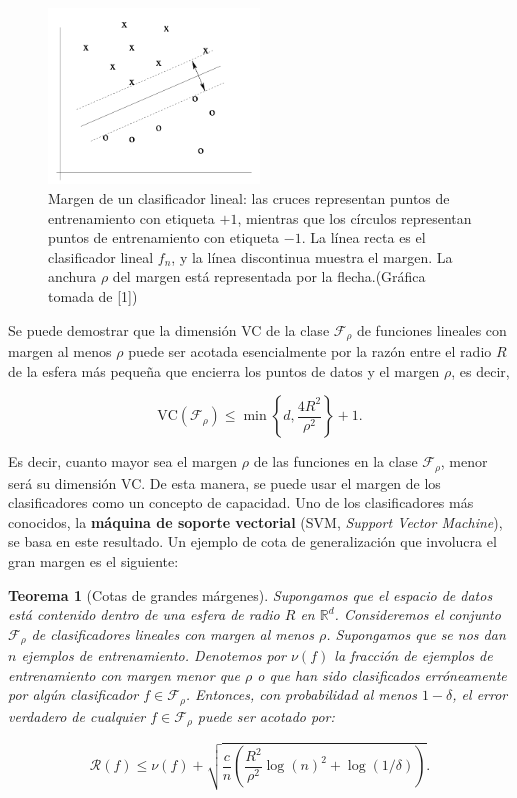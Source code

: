\documentclass{report}
\newtheorem{thm}{Teorema}[section]
\begin{document}
\begin{figure}[ht!]
    \centering
    \includegraphics[width=0.5\textwidth]{Images/6.png}
    \caption{Margen de un clasificador lineal: las cruces representan puntos de entrenamiento con 
    etiqueta \(+1\), mientras que los círculos representan puntos de entrenamiento con etiqueta \(-1\). 
    La línea recta es el clasificador lineal \(f_n\), y la línea discontinua muestra el margen. La 
    anchura \(\rho\) del margen está representada por la flecha.(Gráfica tomada de [1])}
    \label{fig:Clasificación con margen}
\end{figure}

Se puede demostrar que la dimensión VC de la clase \(\mathcal{F}_\rho\) de funciones lineales con 
margen al menos \(\rho\) puede ser acotada esencialmente por la razón entre el radio \(R\) de la 
esfera más pequeña que encierra los puntos de datos y el margen \(\rho\), es decir,

\[
\text{VC}(\mathcal{F}_\rho) \leq \min \left\{d, \frac{4R^2}{\rho^2} \right\} +1.
\]

Es decir, cuanto mayor sea el margen \(\rho\) de las funciones 
en la clase \(\mathcal{F}_\rho\), menor será su dimensión VC. De esta manera, se puede usar el 
margen de los clasificadores como un concepto de capacidad. Uno de los clasificadores más conocidos, 
la \textbf{máquina de soporte vectorial} (SVM, \textit{Support Vector Machine}), se basa en este 
resultado. Un ejemplo de cota de generalización que involucra el gran margen es el siguiente:\newline

\begin{thm}[Cotas de grandes márgenes]

Supongamos que el espacio de datos está contenido dentro de una esfera de radio \(R\) en 
\(\mathbb{R}^d\). Consideremos el conjunto \(\mathcal{F}_\rho\) de clasificadores lineales con 
margen al menos \(\rho\). Supongamos que se nos dan \(n\) ejemplos de entrenamiento. Denotemos 
por \(\nu(f)\) la fracción de ejemplos de entrenamiento con margen menor que \(\rho\) o que han 
sido clasificados erróneamente por algún clasificador \(f \in \mathcal{F}_\rho\). Entonces, con 
probabilidad al menos \(1 - \delta\), el error verdadero de cualquier \(f \in \mathcal{F}_\rho\) 
puede ser acotado por:

\[
\mathcal{R}(f) \leq \nu(f) + \sqrt{\frac{c}{n} \left( \frac{R^2}{\rho^2} \log(n)^2 + \log(1/\delta) \right)} .
\]
\end{thm}
\end{document}
